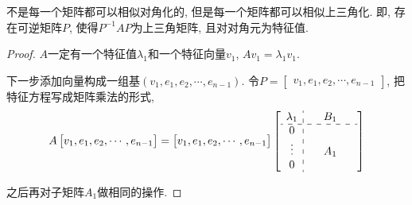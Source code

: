 不是每一个矩阵都可以相似对角化的, 但是每一个矩阵都可以相似上三角化. 即, 存在可逆矩阵$P$, 使得$P ^{-1} A P$为上三角矩阵, 且对对角元为特征值.
\begin{proof}
    $A$一定有一个特征值$\lambda_1$和一个特征向量$v_1$, $A v_1 = \lambda_1 v_1$. 
    
    下一步添加向量构成一组基$\left( v_1,e_1,e_2,\cdots,e_{n-1} \right) $.
    令$P = \begin{bmatrix} v_1, e_1, e_2, \cdots, e_{n-1} \end{bmatrix}$, 把特征方程写成矩阵乘法的形式,
    \begin{equation}
      A \begin{bmatrix} v_1, e_1, e_2, \cdots, e_{n-1} \end{bmatrix} = \begin{bmatrix} v_1, e_1, e_2, \cdots, e_{n-1} \end{bmatrix} 
      \left[
        \begin{array}{c:ccc}
            \lambda_1 & \  & B_1 & \  \\
            \hdashline
            0 & & & \\
            \vdots & & A_1 & \\
            0 & & & \\
        \end{array} 
       \right] 
    \end{equation}

    之后再对子矩阵$A_1$做相同的操作.
\end{proof}